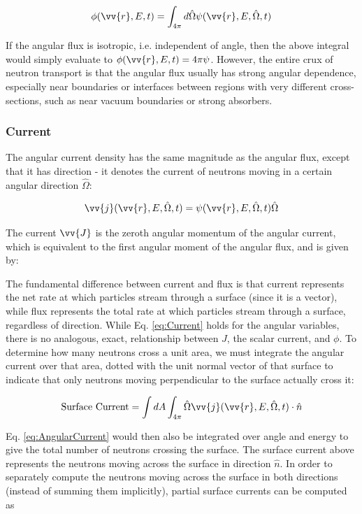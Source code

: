 \documentclass[10pt]{article}
\newcommand{\beq}{\begin{equation}}
\newcommand{\eeq}{\end{equation}}
\newcommand{\hO}{\hat{\Omega}}
\newcommand{\spa}{(\vv{r}, E, \hO, t)}
\newcommand{\spas}{(\vv{r},E,t)}
\begin{document}
\begin{flushleft}
\beq
\label{eq:ScalarFlux}
\phi\spas = \int_{4\pi}^{} d\hO\psi\spa
\eeq

If the angular flux is isotropic, i.e. independent of angle, then the above integral would simply evaluate to \(\phi\spas=4\pi\psi\). However, the entire crux of neutron transport is that the angular flux usually has strong angular dependence, especially near boundaries or interfaces between regions with very different cross-sections, such as near vacuum boundaries or strong absorbers. 

\subsubsection{Current}

The angular current density has the same magnitude as the angular flux, except that it has direction - it denotes the current of neutrons moving in a certain angular direction \(\hO\):

\beq
\label{eq:AngularCurrent}
\vv{j}\spa = \psi\spa\hO  
\eeq

The current \(\vv{J}\) is the zeroth angular momentum of the angular current, which is equivalent to the first angular moment of the angular flux, and is given by:



The fundamental difference between current and flux is that current represents the net rate at which particles stream through a surface (since it is a vector), while flux represents the total rate at which particles stream through a surface, regardless of direction. While Eq. \ref{eq:Current} holds for the angular variables, there is no analogous, exact, relationship between \(J\), the scalar current, and \(\phi\). To determine how many neutrons cross a unit area, we must integrate the angular current over that area, dotted with the unit normal vector of that surface to indicate that only neutrons moving perpendicular to the surface actually cross it:

\beq
\label{eq:AngularCurrent}
\textrm{Surface Current} = \int dA \int_{4\pi}^{}\hO\vv{j}\spa \cdot\hat{n}
\eeq

Eq. \ref{eq:AngularCurrent} would then also be integrated over angle and energy to give the total number of neutrons crossing the surface. The surface current above represents the neutrons moving across the surface in direction \(\hat{n}\). In order to separately compute the neutrons moving across the surface in both directions (instead of summing them implicitly), partial surface currents can be computed as


\end{flushleft}
\end{document}
